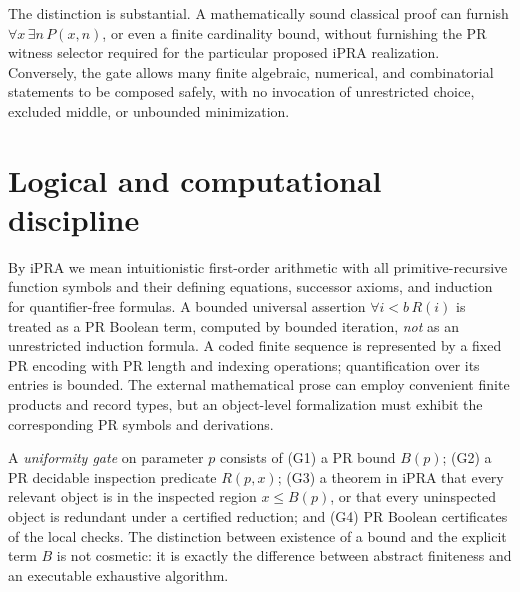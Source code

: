 \documentclass[11pt]{article}
\begin{document}
The distinction is substantial. A mathematically sound classical proof can furnish \(\forall x\,\exists n\,P(x,n)\), or even a finite cardinality bound, without furnishing the PR witness selector required for the particular proposed iPRA realization. Conversely, the gate allows many finite algebraic, numerical, and combinatorial statements to be composed safely, with no invocation of unrestricted choice, excluded middle, or unbounded minimization.

\section{Logical and computational discipline}
By iPRA we mean intuitionistic first-order arithmetic with all primitive-recursive function symbols and their defining equations, successor axioms, and induction for quantifier-free formulas. A bounded universal assertion \(\forall i<b\,R(i)\) is treated as a PR Boolean term, computed by bounded iteration, \emph{not} as an unrestricted induction formula. A coded finite sequence is represented by a fixed PR encoding with PR length and indexing operations; quantification over its entries is bounded. The external mathematical prose can employ convenient finite products and record types, but an object-level formalization must exhibit the corresponding PR symbols and derivations.

A \emph{uniformity gate} on parameter \(p\) consists of (G1) a PR bound \(B(p)\); (G2) a PR decidable inspection predicate \(R(p,x)\); (G3) a theorem in iPRA that every relevant object is in the inspected region \(x\le B(p)\), or that every uninspected object is redundant under a certified reduction; and (G4) PR Boolean certificates of the local checks. The distinction between existence of a bound and the explicit term \(B\) is not cosmetic: it is exactly the difference between abstract finiteness and an executable exhaustive algorithm.
\end{document}
